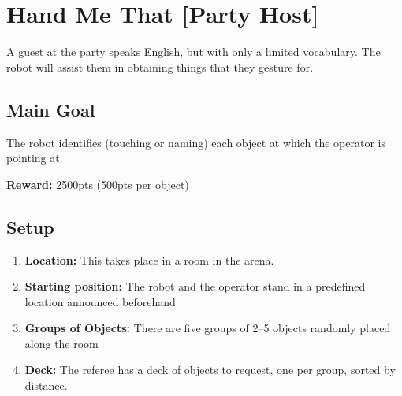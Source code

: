 \section{Hand Me That [Party Host]}
A guest at the party speaks English, but with only a limited vocabulary. The robot will assist them in obtaining things that they gesture for.


\subsection*{Main Goal}
The robot identifies (touching or naming) each object at which the operator is pointing at.

\noindent\textbf{Reward:} 2500pts (500pts per object)


%
%
\subsection*{Setup}
\begin{enumerate}[nosep]
	\item \textbf{Location:} This takes place in a room in the arena.

	\item \textbf{Starting position:} The robot and the operator stand in a predefined location announced beforehand %

	\item \textbf{Groups of Objects:} There are five groups of 2--5 objects randomly placed along the room

	\item \textbf{Deck:} The referee has a deck of objects to request, one per group, sorted by distance.

\end{enumerate}


%
%
